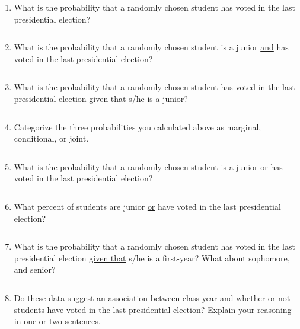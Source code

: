 \documentclass[12pt]{article}
\newcommand{\soln}[2]{$\:$\\ \vspace{#1}}{}
\begin{document}
\begin{enumerate}

\item  What is the probability that a randomly chosen student has voted in the last 
presidential election?

\soln{2cm}{P(voted) = 67 / 176 = 0.38}

\item What is the probability that a randomly chosen student is a junior \underline{and} 
has voted in the last presidential election?

\soln{2cm}{P(junior and voted) = 41 / 176 = 0.23}

\item What is the probability that a randomly chosen student  has voted in the last presidential 
election \underline{given that} s/he is a junior?

\soln{2cm}{P(voted~$|$~junior) = 41 / 54 = 0.76}

\item Categorize the three probabilities you calculated above as marginal, conditional, 
or joint.

\soln{2cm}{1. marginal, 2. joint, 3. conditional}

\item What is the probability that a randomly chosen student is a junior \underline{or} 
has voted in the last presidential election?

\soln{2cm}{P(junior or voted) = (67 + 54 - 41) / 176 =  0.45}

\item What percent of students are junior \underline{or} have voted in the last 
presidential election?

\soln{1cm}{Same as above, 45\%.}

\item What is the probability that a randomly chosen student has voted in the last presidential 
election \underline{given that} s/he is a first-year? What about sophomore, and senior?

\soln{2cm}{P(voted~$|$~first-year) = 3 / 44 = 0.07 \\
P(voted~$|$~sophomore) = 14 / 64 = 0.22 \\
P(voted~$|$~senior) = 9 / 14 = 0.64}

\item Do these data suggest an association between class year and whether or not 
students have voted in the last presidential election? Explain your reasoning in one or 
two sentences.

\soln{2cm}{Yes, it does. Likelihood of voting varies by class year.}

\end{enumerate}
\end{document}
